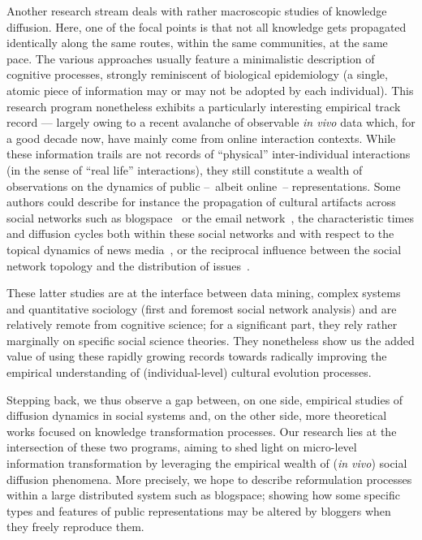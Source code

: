 Another research stream deals with rather macroscopic studies of knowledge diffusion. Here, one of the focal points is that not all knowledge gets propagated identically along the same routes, within the same communities, at the same pace. The various approaches usually feature a minimalistic description of cognitive processes, strongly reminiscent of biological epidemiology (a single, atomic piece of information may or may not be adopted by each individual).
This research program nonetheless exhibits a particularly interesting empirical track record --- largely owing to a recent avalanche of observable \emph{in vivo} data which, for a good decade now, have mainly come from online interaction contexts.
While these information trails are not records of ``physical'' inter-individual interactions (in the sense of ``real life'' interactions), they still constitute a wealth of observations on the dynamics of public --~albeit online~-- representations.
Some authors could describe for instance the propagation of cultural artifacts across social networks such as blogspace~\citep{Gruhl04} or the email network~\citep{Liben-Nowell25032008}, the characteristic times and diffusion cycles both within these social networks and with respect to the topical dynamics of news media~\citep{Leskovec09}, or the reciprocal influence between the social network topology and the distribution of issues~\citep{Cointet09}.

These latter studies are at the interface between data mining, complex systems and quantitative sociology (first and foremost social network analysis) and are relatively remote from cognitive science; for a significant part, they rely rather marginally on specific social science theories. They nonetheless show us the added value of using these rapidly growing records %
towards radically improving the empirical understanding of (individual-level) cultural evolution processes.


\bigskip
Stepping back, we thus observe a gap between, on one side, empirical studies of diffusion dynamics in social systems and, on the other side, more theoretical works  focused on knowledge transformation processes. %
Our research lies at the intersection of these two programs, aiming to shed light on micro-level information transformation by leveraging the empirical wealth of (\emph{in vivo}) social diffusion phenomena. More precisely, we hope to describe reformulation processes within a large distributed system such as blogspace; showing how some specific types and features of public representations may be altered by bloggers when they freely reproduce them.

